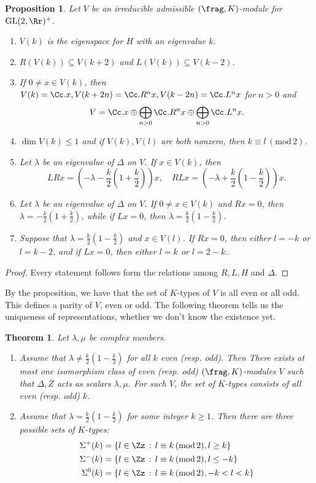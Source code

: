 \documentclass{article}
\newtheorem{theorem}{Theorem}[section]
\newcommand{\GL}{\mathrm{GL}}
\newcommand{\Mod}[1]{\,(\mathrm{mod}\,#1)}
\newtheorem{proposition}{Proposition}[section]
\begin{document}
\begin{proposition}
Let $V$ be an irreducible admissible $(\frag, K)$-module for $\GL(2, \Rr)^{+}$. 
\begin{enumerate}
\item $V(k)$ is the eigenspace for $H$ with an eigenvalue $k$. 
\item $R(V(k)) \subseteq V(k+2)$ and $L(V(k))\subseteq V(k-2)$. 
\item If $0\neq x\in V(k)$, then $V(k) = \Cc. x, V(k+2n) = \Cc. R^{n}x, V(k-2n) =\Cc. L^{n}x$ for $n>0$ and 
$$
V = \Cc. x \oplus \bigoplus _{n>0} \Cc. R^{n}x \oplus \bigoplus_{n>0} \Cc. L^{n}x.
$$
\item $\dim V(k) \leq 1$ and if $V(k), V(l)$ are both nonzero, then $k\equiv l\Mod{2}$. 
\item Let $\lambda$ be an eigenvalue of $\Delta$ on $V$. If $x\in V(k)$, then 
$$
LRx=\left( -\lambda - \frac{k}{2}\left(1 + \frac{k}{2}\right)\right) x, \quad RLx = \left( - \lambda + \frac{k}{2}\left( 1- \frac{k}{2}\right)\right)x.
$$
\item Let $\lambda$ be an eigenvalue of $\Delta$ on $V$. If $0\neq x\in V(k)$ and $Rx = 0$, then $\lambda = -\frac{k}{2}\left( 1 +\frac{k}{2}\right)$, while if $Lx = 0$, then $\lambda = \frac{k}{2}\left(1-\frac{k}{2}\right)$. 
\item Suppose that $\lambda = \frac{k}{2}\left( 1-\frac{k}{2}\right)$ and $x\in V(l)$. If $Rx =0$, then either $l =-k$ or $l = k-2$, and if $Lx = 0$, then either $l = k$ or $l = 2-k$. 
\end{enumerate}
\end{proposition}
\begin{proof}
Every statement follows form the relations among $R, L, H$ and $\Delta$. 
\end{proof}
By the proposition, we have that the set of $K$-types of $V$ is all even or all odd. This defines a parity of $V$, even or odd. 
The following theorem tells us the uniqueness of representations, whether we don't know the existence yet. 
\begin{theorem}
Let $\lambda, \mu$ be complex numbers. 
\begin{enumerate}
\item Assume that $\lambda \neq \frac{k}{2}\left( 1-\frac{k}{2}\right)$ for all $k$ even (resp. odd). Then There exists at most one isomorphism class of even (resp. odd) $(\frag, K)$-modules $V$ such that $\Delta, Z$ acts as scalars $\lambda, \mu$. For such $V$, the set of $K$-types consists of all even (resp. odd) $k$. 
\item Assume that $\lambda = \frac{k}{2}\left(1-\frac{k}{2}\right)$ for some integer $k\geq 1$. Then there are three possible sets of $K$-types:
\begin{align*}
\Sigma^{+}(k) &= \{l\in \Zz\,:\, l\equiv k\Mod{2}, l\geq k\} \\
\Sigma^{-}(k) &= \{l\in \Zz\,:\, l\equiv k\Mod{2}, l\leq -k\} \\
\Sigma^{0}(k) &= \{l\in \Zz\,:\, l\equiv k\Mod{2}, -k < l < k\}
\end{align*}
\end{enumerate}
\end{theorem}
\end{document}
